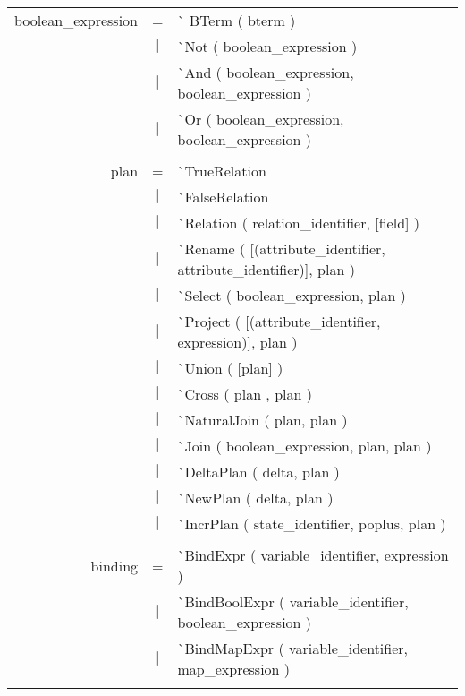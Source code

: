 \documentclass{article}
\begin{document}
\begin{tabular}[ht] {rcl}
boolean\_expression &=& \`{} BTerm ( bterm )\\
&$\lvert$ & \`{}Not ( boolean\_expression )\\
&$\lvert$ & \`{}And ( boolean\_expression,  boolean\_expression )\\
&$\lvert$ & \`{}Or ( boolean\_expression,  boolean\_expression )\\
\\
plan &=& \`{}TrueRelation\\
&$\lvert$ & \`{}FalseRelation\\
&$\lvert$ & \`{}Relation ( relation\_identifier, [field] )\\
&$\lvert$ & \`{}Rename ( [(attribute\_identifier, attribute\_identifier)], plan ) \\
&$\lvert$ & \`{}Select ( boolean\_expression, plan )\\
&$\lvert$ & \`{}Project ( [(attribute\_identifier, expression)], plan )\\
&$\lvert$ & \`{}Union ( [plan] )\\
&$\lvert$ & \`{}Cross ( plan , plan )\\
&$\lvert$ & \`{}NaturalJoin ( plan,  plan )\\
&$\lvert$ & \`{}Join ( boolean\_expression,  plan,  plan )\\
&$\lvert$ & \`{}DeltaPlan ( delta, plan )\\
&$\lvert$ & \`{}NewPlan ( delta, plan )\\
&$\lvert$ & \`{}IncrPlan ( state\_identifier, poplus, plan ) \\
\\
binding &=& \`{}BindExpr ( variable\_identifier,  expression )\\
&$\lvert$ & \`{}BindBoolExpr ( variable\_identifier,  boolean\_expression )\\
&$\lvert$ & \`{}BindMapExpr ( variable\_identifier, map\_expression ) \\
\\
\end{tabular}
\pagebreak
\end{document}
